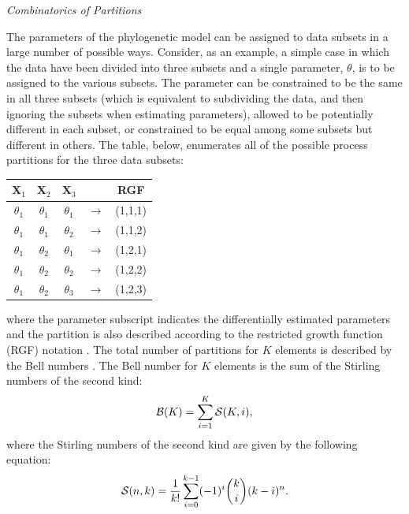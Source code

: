 \documentclass[11pt]{article}
\begin{document}
\bigskip

\begin{center}
{\it Combinatorics of Partitions}
\end{center}

The parameters of the phylogenetic model can be assigned to data subsets in a large number of possible ways.
Consider, as an example, a simple case in which the data have been divided into three subsets and a single parameter, $\theta$, is to be assigned to the various subsets.
The parameter can be constrained to be the same in all three subsets (which is equivalent to subdividing the data, and then ignoring the subsets when estimating parameters), allowed to be potentially different in each subset, or constrained to be equal among some subsets but different in others.
The table, below, enumerates all of the possible process partitions for the three data subsets:
\begin{center}
\begin{tabular}{ccccc}
${\mathbf X}_1$ & ${\mathbf X}_2$ & ${\mathbf X}_3$ & & RGF \\ \hline
$\theta_1$ & $\theta_1$ & $\theta_1$ & $\rightarrow$ & (1,1,1) \\
$\theta_1$ & $\theta_1$ & $\theta_2$ & $\rightarrow$ & (1,1,2) \\
$\theta_1$ & $\theta_2$ & $\theta_1$ & $\rightarrow$ & (1,2,1) \\
$\theta_1$ & $\theta_2$ & $\theta_2$ & $\rightarrow$ & (1,2,2) \\
$\theta_1$ & $\theta_2$ & $\theta_3$ & $\rightarrow$ & (1,2,3) \\
\end{tabular}
\end{center}
where the parameter subscript indicates the differentially estimated parameters and the partition is also described according to the restricted growth function (RGF) notation \citep{stanton86}. 
The total number of partitions for $K$ elements is described by the Bell numbers \citep{bell34}.
The Bell number for $K$ elements is the sum of the Stirling numbers of the second kind:
\begin{align} \label{eq:bell_num}
{\cal B}(K) = \sum_{i=1}^K {\cal S}(K,i),
\end{align}
where the Stirling numbers of the second kind are given by the following equation:
\begin{align}
{\cal S}(n, k) = {1 \over k!} \sum_{i=0}^{k-1} (-1)^i {k \choose i} (k-i)^{n}.
\end{align}
\end{document}
